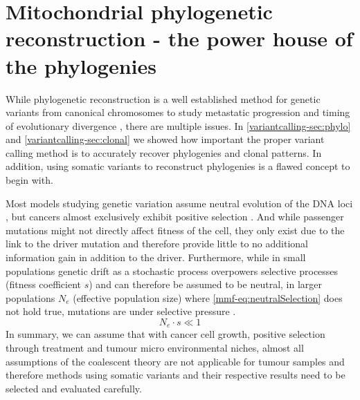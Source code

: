 \section[Mitochondrial phylogenetic reconstruction]{Mitochondrial phylogenetic reconstruction - the power house of the phylogenies}
\label{cascade-sec:mitochondria}

While phylogenetic reconstruction is a well established method for genetic variants from canonical chromosomes to study metastatic progression and timing of evolutionary divergence \cite{Deshwar2015,Brown2017,Hu2019}, there are multiple issues. In \autoref{variantcalling-sec:phylo} and \autoref{variantcalling-sec:clonal} we showed how important the proper variant calling method is to accurately recover phylogenies and clonal patterns. In addition, using somatic variants to reconstruct phylogenies is a flawed concept to begin with. 

Most models studying genetic variation assume neutral evolution of the DNA loci \cite{Kimura1968,Lynch1989}, but cancers almost exclusively exhibit positive selection \cite{Cannataro2018}. And while passenger mutations might not directly affect fitness of the cell, they only exist due to the link to the driver mutation and therefore provide little to no additional information gain in addition to the driver. Furthermore, while in small populations genetic drift as a stochastic process overpowers selective processes (fitness coefficient $s$) and can therefore be assumed to be neutral, in larger populations $N_e$ (effective population size) where \autoref{mmf-eq:neutralSelection} does not hold true, mutations are under selective pressure \cite{EyreWalker2007}.
\begin{equation}
N_e \cdot s \ll 1 \label{mmf-eq:neutralSelection}
\end{equation}
\myequation[\ref{mmf-eq:neutralSelection}]{Selective pressure with effective population size}
\vspace{-3em}
In summary, we can assume that with cancer cell growth, positive selection through treatment and tumour micro environmental niches, almost all assumptions of the coalescent theory \cite{Kingman1982} are not applicable for tumour samples and therefore methods using somatic variants and their respective results need to be selected and evaluated carefully.

